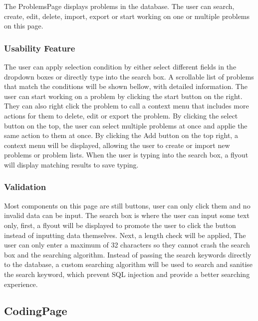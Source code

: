 \documentclass[a4paper]{report}
\begin{document}
The ProblemsPage displays problems in the database. The user can search, create, edit, delete, import, export or start working on one or multiple problems on this page.

\subsubsection{Usability Feature}

The user can apply selection condition by either select different fields in the dropdown boxes or directly type into the search box. A scrollable list of problems that match the conditions will be shown bellow, with detailed information. The user can start working on a problem by clicking the start button on the right. They can also right click the problem to call a context menu that includes more actions for them to delete, edit or export the problem. By clicking the select button on the top, the user can select multiple problems at once and applie the same action to them at once. By clicking the Add button on the top right, a context menu will be displayed, allowing the user to create or import new problems or problem lists. When the user is typing into the search box, a flyout will display matching results to save typing.

\subsubsection{Validation}

Most components on this page are still buttons, user can only click them and no invalid data can be input. The search box is where the user can input some text only, first, a flyout will be displayed to promote the user to click the button instead of inputting data themselves. Next, a length check will be applied, The user can only enter a maximum of 32 characters so they cannot crash the search box and the searching algorithm. Instead of passing the search keywords directly to the database, a custom searching algorithm will be used to search and sanitise the search keyword, which prevent SQL injection and provide a better searching experience.

\subsection{CodingPage}
\end{document}
